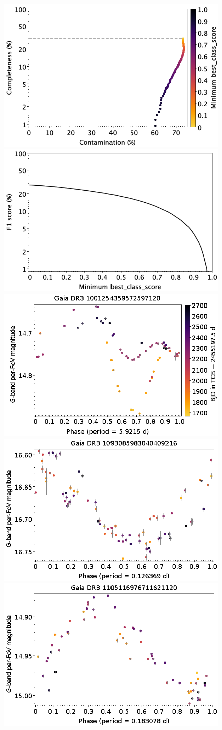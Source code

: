 \documentclass[longauth]{aa}
\begin{document}
\begin{appendix}
\begin{figure}
\centering
{} \includegraphics[width=0.45\hsize]{figures/appendix/RS_cls_scc.png}  
\hspace{2mm}
 \includegraphics[width=0.45\hsize]{figures/appendix/RS_cls_sf1.png} \\  
\vspace{4mm}
 \includegraphics[width=0.45\hsize]{figures/appendix/RS-1.png}  
\hspace{2mm}
 \includegraphics[width=0.45\hsize]{figures/appendix/RS-65.png} \\
\vspace{4mm}
 \includegraphics[width=0.45\hsize]{figures/appendix/RS-73.png}  

\end{figure}
\end{appendix}
\end{document}
